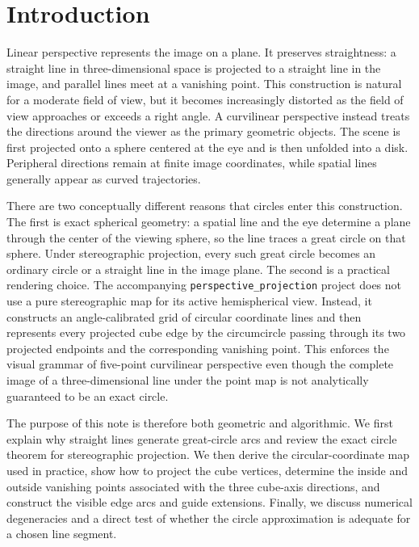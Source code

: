 \section{Introduction}
Linear perspective represents the image on a plane.  It preserves straightness: a straight line in three-dimensional space is projected to a straight line in the image, and parallel lines meet at a vanishing point.  This construction is natural for a moderate field of view, but it becomes increasingly distorted as the field of view approaches or exceeds a right angle.  A curvilinear perspective instead treats the directions around the viewer as the primary geometric objects.  The scene is first projected onto a sphere centered at the eye and is then unfolded into a disk.  Peripheral directions remain at finite image coordinates, while spatial lines generally appear as curved trajectories.

There are two conceptually different reasons that circles enter this construction.  The first is exact spherical geometry: a spatial line and the eye determine a plane through the center of the viewing sphere, so the line traces a great circle on that sphere.  Under stereographic projection, every such great circle becomes an ordinary circle or a straight line in the image plane.  The second is a practical rendering choice.  The accompanying \texttt{perspective\_projection} project does not use a pure stereographic map for its active hemispherical view.  Instead, it constructs an angle-calibrated grid of circular coordinate lines and then represents every projected cube edge by the circumcircle passing through its two projected endpoints and the corresponding vanishing point.  This enforces the visual grammar of five-point curvilinear perspective even though the complete image of a three-dimensional line under the point map is not analytically guaranteed to be an exact circle.

The purpose of this note is therefore both geometric and algorithmic.  We first explain why straight lines generate great-circle arcs and review the exact circle theorem for stereographic projection.  We then derive the circular-coordinate map used in practice, show how to project the cube vertices, determine the inside and outside vanishing points associated with the three cube-axis directions, and construct the visible edge arcs and guide extensions.  Finally, we discuss numerical degeneracies and a direct test of whether the circle approximation is adequate for a chosen line segment.

